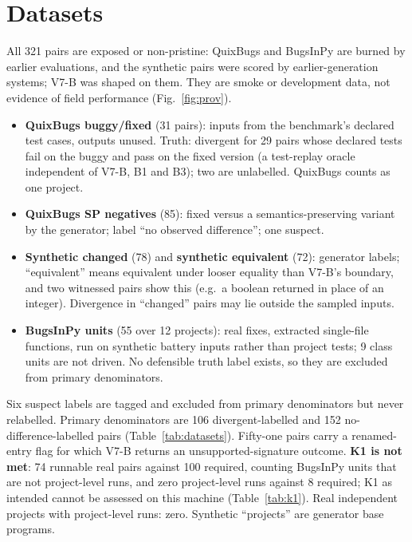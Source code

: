 \section{Datasets}\label{sec:datasets}
All 321 pairs are exposed or non-pristine: QuixBugs and BugsInPy are burned by earlier evaluations, and the synthetic pairs were scored by earlier-generation systems; V7-B was shaped on them. They are smoke or development data, not evidence of field performance (Fig.~\ref{fig:prov}).
\begin{itemize}
\item \textbf{QuixBugs buggy/fixed} (31 pairs): inputs from the benchmark's declared test cases, outputs unused. Truth: divergent for 29 pairs whose declared tests fail on the buggy and pass on the fixed version (a test-replay oracle independent of V7-B, B1 and B3); two are unlabelled. QuixBugs counts as one project.
\item \textbf{QuixBugs SP negatives} (85): fixed versus a semantics-preserving variant by the generator; label ``no observed difference''; one suspect.
\item \textbf{Synthetic changed} (78) and \textbf{synthetic equivalent} (72): generator labels; ``equivalent'' means equivalent under looser equality than V7-B's boundary, and two witnessed pairs show this (e.g.\ a boolean returned in place of an integer). Divergence in ``changed'' pairs may lie outside the sampled inputs.
\item \textbf{BugsInPy units} (55 over 12 projects): real fixes, extracted single-file functions, run on synthetic battery inputs rather than project tests; 9 class units are not driven. No defensible truth label exists, so they are excluded from primary denominators.
\end{itemize}
Six suspect labels are tagged and excluded from primary denominators but never relabelled. Primary denominators are 106 divergent-labelled and 152 no-difference-labelled pairs (Table~\ref{tab:datasets}). Fifty-one pairs carry a renamed-entry flag for which V7-B returns an unsupported-signature outcome. \textbf{K1 is not met}: 74 runnable real pairs against 100 required, counting BugsInPy units that are not project-level runs, and zero project-level runs against 8 required; K1 as intended cannot be assessed on this machine (Table~\ref{tab:k1}). Real independent projects with project-level runs: zero. Synthetic ``projects'' are generator base programs.

